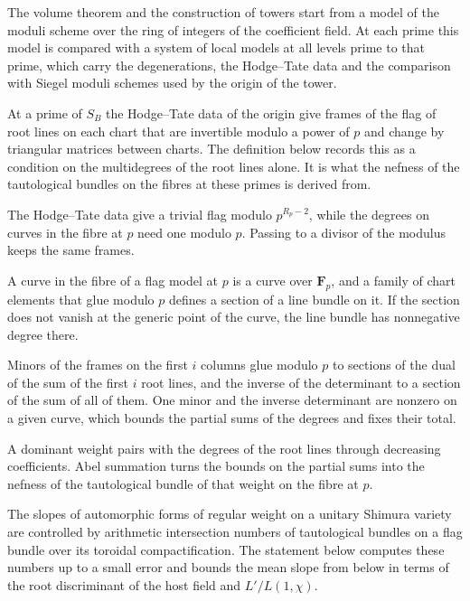 The volume theorem and the construction of towers start from a model of the moduli scheme over the
ring of integers of the coefficient field. At each prime this model is compared with a system of local
models at all levels prime to that prime, which carry the degenerations, the Hodge--Tate data and the
comparison with Siegel moduli schemes used by the origin of the tower.

At a prime of $S_B$ the Hodge--Tate data of the origin give frames of the flag of root lines on each
chart that are invertible modulo a power of $p$ and change by triangular matrices between charts. The
definition below records this as a condition on the multidegrees of the root lines alone. It is what the
nefness of the tautological bundles on the fibres at these primes is derived from.

The Hodge--Tate data give a trivial flag modulo $p^{R_p-2}$, while the degrees on curves in the fibre at
$p$ need one modulo $p$. Passing to a divisor of the modulus keeps the same frames.

A curve in the fibre of a flag model at $p$ is a curve over $\mathbf F_p$, and a family of chart
elements that glue modulo $p$ defines a section of a line bundle on it. If the section does not vanish
at the generic point of the curve, the line bundle has nonnegative degree there.

Minors of the frames on the first $i$ columns glue modulo $p$ to sections of the dual of the sum of the
first $i$ root lines, and the inverse of the determinant to a section of the sum of all of them. One
minor and the inverse determinant are nonzero on a given curve, which bounds the partial sums of the
degrees and fixes their total.

A dominant weight pairs with the degrees of the root lines through decreasing coefficients. Abel
summation turns the bounds on the partial sums into the nefness of the tautological bundle of that
weight on the fibre at $p$.

The slopes of automorphic forms of regular weight on a unitary Shimura variety are
controlled by arithmetic intersection numbers of tautological bundles on a flag bundle over
its toroidal compactification. The statement below computes these numbers up to a small
error and bounds the mean slope from below in terms of the root discriminant of the host
field and $L'/L(1,\chi)$.

